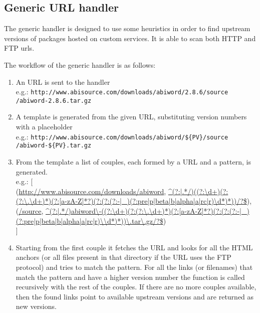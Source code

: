 \subsection{Generic URL handler}
The generic handler is designed to use some heuristics in order to find upstream versions of packages hosted on custom services. It is able to scan both HTTP and FTP urls.

The workflow of the generic handler is as follows:

\begin{enumerate}
\item An URL is sent to the handler \\ 
e.g.: \texttt{http://www.abisource.com/downloads/abiword/2.8.6/source} \\
\texttt{/abiword-2.8.6.tar.gz}

\item A template is generated from the given URL, substituting version numbers with a placeholder \\
e.g.: \texttt{http://www.abisource.com/downloads/abiword/\$\{PV\}/source} \\
\texttt{/abiword-\$\{PV\}.tar.gz}


\item From the template a list of couples, each formed by a URL and a pattern, is generated. \\
e.g.: [\\
    (\url{http://www.abisource.com/downloads/abiword}, \url{^(?:|.*/)((?:\d+)(?:(?:\.\d+)*)(?:[a-zA-Z]*?)(?:(?:(?:-|_)(?:pre|p|beta|b|alpha|a|rc|r)\d*)*))/?\$}), \\

    (\url{/source}, \url{^(?:|.*/)abiword\-((?:\d+)(?:(?:\.\d+)*)(?:[a-zA-Z]*?)(?:(?:(?:-|_)(?:pre|p|beta|b|alpha|a|rc|r)\\d*)*))\.tar\.gz/?\$}) \\
]
 
\item Starting from the first couple it fetches the URL and looks for all the HTML anchors (or all files present in that directory if the URL uses the FTP protocol) and tries to match the pattern. For all the links (or filenames) that match the pattern and have a higher version number the function is called recursively with the rest of the couples. If there are no more couples available, then the found links point to available upstream versions and are returned as new versions.
\end{enumerate}

